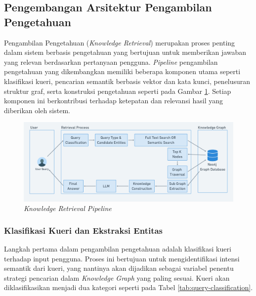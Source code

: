 \subsection{Pengembangan Arsitektur Pengambilan Pengetahuan}
Pengambilan Pengetahuan (\textit{Knowledge Retrieval}) merupakan proses penting dalam sistem berbasis pengetahuan yang bertujuan untuk memberikan jawaban yang relevan berdasarkan pertanyaan pengguna.
\textit{Pipeline} pengambilan pengetahuan yang dikembangkan memiliki beberapa komponen utama seperti klasifikasi kueri, pencarian semantik berbasis vektor dan kata kunci, penelusuran struktur graf, serta konstruksi pengetahuan seperti pada Gambar \ref{fig:knowledge-retrieval-pipeline}.
Setiap komponen ini berkontribusi terhadap ketepatan dan relevansi hasil yang diberikan oleh sistem.

\begin{figure}[h]
	\centering
	\includegraphics[width=1\textwidth]{images/knowledge-retrieval-pipeline.png}
	\caption{\textit{Knowledge Retrieval Pipeline}}
	\label{fig:knowledge-retrieval-pipeline}
\end{figure}

\subsubsection{Klasifikasi Kueri dan Ekstraksi Entitas}
Langkah pertama dalam pengambilan pengetahuan adalah klasifikasi kueri terhadap input pengguna.
Proses ini bertujuan untuk mengidentifikasi intensi semantik dari kueri, yang nantinya akan dijadikan sebagai variabel penentu strategi pencarian dalam \textit{Knowledge Graph} yang paling sesuai.
Kueri akan diklasifikasikan menjadi dua kategori seperti pada Tabel \ref{tab:query-classification}.

